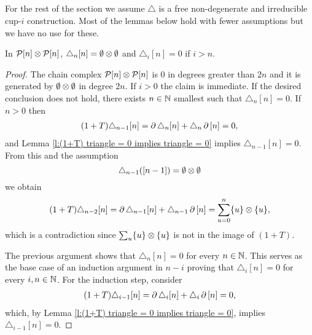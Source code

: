 \subsection{}

For the rest of the section we assume $\triangle$ is a free non-degenerate and irreducible cup-$i$ construction.
Most of the lemmas below hold with fewer assumptions but we have no use for these.

\begin{lemma}
	In $\mathcal{P}[n] \otimes \mathcal{P}[n]$,	$\triangle_n[n] = \emptyset \otimes \emptyset$ and $\triangle_i [n] = 0$ if $i > n$.
\end{lemma}

\begin{proof}
	The chain complex $\mathcal{P}[n] \otimes \mathcal{P}[n]$ is $0$ in degrees greater than $2n$ and it is generated by $\emptyset \otimes \emptyset$ in degree $2n$.
	If $i > 0$ the claim is immediate.
	If the desired conclusion does not hold, there exists $n \in \mathbb{N}$ smallest such that $\triangle_n  [n] = 0$.
	If $n > 0$ then
    \begin{align*}
    (1+T) \triangle_{n-1} [n] =
    \operatorname{\partial} \triangle_{n} [n] + \triangle_{n} \operatorname{\partial} \, [n] = 0,
    \end{align*}
    and Lemma \ref{l:(1+T) triangle = 0 implies triangle = 0} implies $\triangle_{n-1} [n] = 0$.
	From this and the assumption
    \[
    \triangle_{n-1} ({[n-1]}) = \emptyset \otimes \emptyset
    \]
    we obtain
    \begin{equation}
    \begin{split}
    (1+T)\triangle_{n-2} [n] =
    \operatorname{\partial} \triangle_{n-1} [n] + \triangle_{n-1} \operatorname{\partial} \, [n] =
    \sum_{u = 0}^n \{u\} \otimes \{u\},
    \end{split}
    \end{equation}
 	which is a contradiction since $\sum_u \{u\} \otimes \{u\}$ is not in the image of $(1+T)$.

    The previous argument shows that $\triangle_n [n] = 0$ for every $n \in \mathbb{N}$.
	This serves as the base case of an induction argument in $n-i$ proving that $\triangle_i [n] = 0$ for every $i, n \in \mathbb{N}$.
	For the induction step, consider
    \begin{align*}
    (1+T) \triangle_{i-1} [n] =
    \operatorname{\partial} \triangle_{i} [n] + \triangle_{i} \operatorname{\partial}\, [n] = 0,
    \end{align*}
    which, by Lemma \ref{l:(1+T) triangle = 0 implies triangle = 0}, implies $\triangle_{i-1}  [n] = 0$.
\end{proof}

